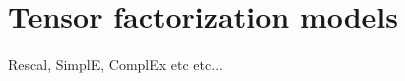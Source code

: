 \section{Tensor factorization models}\label{sec:emb-tensors}
Rescal, SimplE, ComplEx etc etc...





